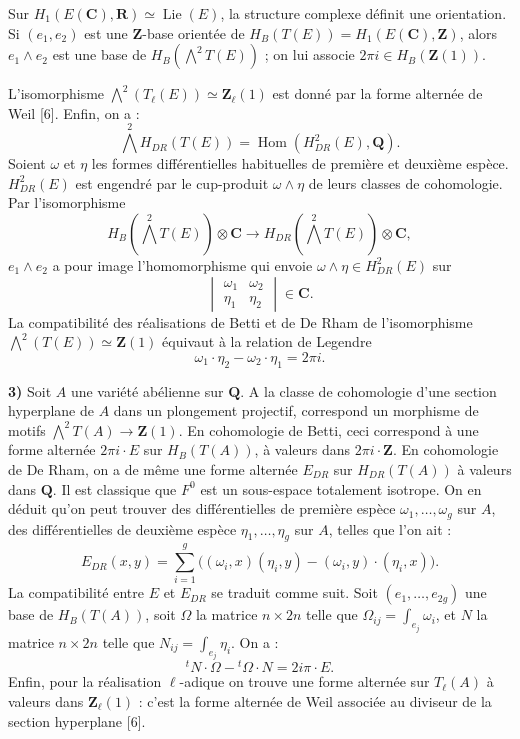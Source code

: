 \documentclass[10pt,a4paper]{article}
\newcommand{\Z}{\mathbf Z}
\newcommand{\Q}{\mathbf Q}
\newcommand{\R}{\mathbf R}
\newcommand{\C}{\mathbf C}
\begin{document}
Sur $H_1(E(\C),\R)\simeq\operatorname{Lie}(E)$, la structure complexe définit une orientation. Si $(e_1,e_2)$ est une $\Z$-base orientée de $H_B(T(E))=H_1(E(\C),\Z)$, alors $e_1\wedge e_2$ est une base de $H_B(\bigwedge^2T(E))$ ; on lui associe $2\pi i\in H_B(\Z(1))$.

L'isomorphisme $\bigwedge^2(T_\ell(E))\simeq\Z_\ell(1)$ est donné par la forme alternée de Weil [6]. Enfin, on a :
\[
\bigwedge^2H_{DR}(T(E))=\operatorname{Hom}(H^2_{DR}(E),\Q).
\]
Soient $\omega$ et $\eta$ les formes différentielles habituelles de première et deuxième espèce. $H^2_{DR}(E)$ est engendré par le cup-produit $\omega\wedge\eta$ de leurs classes de cohomologie. Par l'isomorphisme
\[
H_B(\bigwedge^2T(E))\otimes\C\longrightarrow H_{DR}(\bigwedge^2T(E))\otimes\C,
\]
$e_1\wedge e_2$ a pour image l'homomorphisme qui envoie $\omega\wedge\eta\in H^2_{DR}(E)$ sur
\[
\begin{vmatrix}\omega_1&\omega_2\\\eta_1&\eta_2\end{vmatrix}\in\C.
\]
La compatibilité des réalisations de Betti et de De Rham de l'isomorphisme $\bigwedge^2(T(E))\simeq\Z(1)$ équivaut à la relation de Legendre
\[
\omega_1\cdot\eta_2-\omega_2\cdot\eta_1=2\pi i.
\]


\newpage


\textbf{3)} Soit $A$ une variété abélienne sur $\Q$. A la classe de cohomologie d'une section hyperplane de $A$ dans un plongement projectif, correspond un morphisme de motifs $\bigwedge^2T(A)\to\Z(1)$. En cohomologie de Betti, ceci correspond à une forme alternée $2\pi i\cdot E$ sur $H_B(T(A))$, à valeurs dans $2\pi i\cdot\Z$. En cohomologie de De Rham, on a de même une forme alternée $E_{DR}$ sur $H_{DR}(T(A))$ à valeurs dans $\Q$. Il est classique que $F^0$ est un sous-espace totalement isotrope. On en déduit qu'on peut trouver des différentielles de première espèce $\omega_1,\ldots,\omega_g$ sur $A$, des différentielles de deuxième espèce $\eta_1,\ldots,\eta_g$ sur $A$, telles que l'on ait :
\[
E_{DR}(x,y)=\sum_{i=1}^g\bigl((\omega_i,x)(\eta_i,y)-(\omega_i,y)\cdot(\eta_i,x)\bigr).
\]
La compatibilité entre $E$ et $E_{DR}$ se traduit comme suit. Soit $(e_1,\ldots,e_{2g})$ une base de $H_B(T(A))$, soit $\Omega$ la matrice $n\times2n$ telle que $\Omega_{ij}=\int_{e_j}\omega_i$, et $N$ la matrice $n\times2n$ telle que $N_{ij}=\int_{e_j}\eta_i$. On a :
\[
{}^tN\cdot\Omega-{}^t\Omega\cdot N=2i\pi\cdot E.
\]
Enfin, pour la réalisation $\ell$-adique on trouve une forme alternée sur $T_\ell(A)$ à valeurs dans $\Z_\ell(1)$ : c'est la forme alternée de Weil associée au diviseur de la section hyperplane [6].
\end{document}
